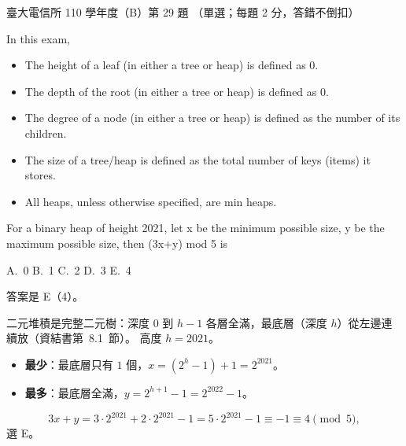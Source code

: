 \begin{pastexam}[label={px:ntu-110-comm-dsa-29}]{臺大電信所 110 學年度（B）第 29 題}
（單選；每題 2 分，答錯不倒扣）

In this exam,
\begin{itemize}
\item The height of a leaf (in either a tree or heap) is defined as 0.
\item The depth of the root (in either a tree or heap) is defined as 0.
\item The degree of a node (in either a tree or heap) is defined as the number of its children.
\item The size of a tree/heap is defined as the total number of keys (items) it stores.
\item All heaps, unless otherwise specified, are min heaps.
\end{itemize}

For a binary heap of height 2021, let x be the minimum possible size, y be the maximum possible size, then (3x+y) mod 5 is

A.~0 \qquad B.~1 \qquad C.~2 \qquad D.~3 \qquad E.~4
\end{pastexam}

\begin{pastsoln}
答案是 E（4）。

二元堆積是完整二元樹：深度 $0$ 到 $h - 1$ 各層全滿，最底層（深度 $h$）從左邊連續放（資結書第~8.1~節）。
高度 $h = 2021$。
\begin{itemize}
\item \textbf{最少}：最底層只有 $1$ 個，$x = (2^{h} - 1) + 1 = 2^{2021}$。
\item \textbf{最多}：最底層全滿，$y = 2^{h+1} - 1 = 2^{2022} - 1$。
\end{itemize}
\[
3x + y = 3 \cdot 2^{2021} + 2 \cdot 2^{2021} - 1 = 5 \cdot 2^{2021} - 1 \equiv -1 \equiv 4 \pmod 5,
\]
選 E。
\end{pastsoln}
